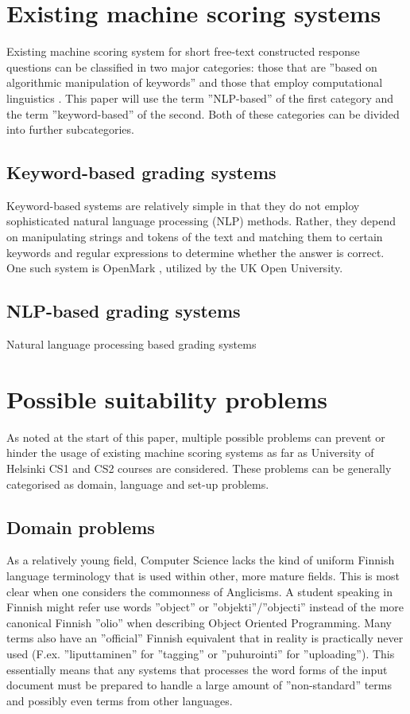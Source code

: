\documentclass[english]{tktltiki2}
\theoremstyle{definition}
\theoremstyle{remark}
\begin{document}
\section{Existing machine scoring systems}

Existing machine scoring system for short free-text constructed response questions can be classified in two major categories: those that are ''based on algorithmic manipulation of keywords'' \cite{butcher10} and those that employ computational linguistics . This paper will use the term ''NLP-based'' of the first category and the term ''keyword-based'' of the second. Both of these categories can be divided into further subcategories.

\subsection{Keyword-based grading systems}

Keyword-based systems are relatively simple in that they do not employ sophisticated natural language processing (NLP) methods. Rather, they depend on manipulating strings and tokens of the text and matching them to certain keywords and regular expressions to determine whether the answer is correct. One such system is OpenMark \cite{butcher06}, utilized by the UK Open University.

\subsection{NLP-based grading systems}

Natural language processing based grading systems

\section{Possible suitability problems}
\label{sec:problems}

As noted at the start of this paper, multiple possible problems can prevent or hinder the usage of existing machine scoring systems as far as University of Helsinki CS1 and CS2 courses are considered. These problems can be generally categorised as domain, language and set-up problems. 

\subsection{Domain problems}
\label{sec:domain-problems}

As a relatively young field, Computer Science lacks the kind of uniform Finnish language terminology that is used within other, more mature fields. This is most clear when one considers the commonness of Anglicisms. A student speaking in Finnish might refer use words ''object'' or ''objekti''/''objecti'' instead of the more canonical Finnish ''olio'' when describing Object Oriented Programming. Many terms also have an ''official'' Finnish equivalent that in reality is practically never used (F.ex. ''liputtaminen'' for ''tagging'' or ''puhurointi'' for ''uploading''). This essentially means that any systems that processes the word forms of the input document must be prepared to handle a large amount of ''non-standard'' terms and possibly even terms from other languages.
\end{document}
